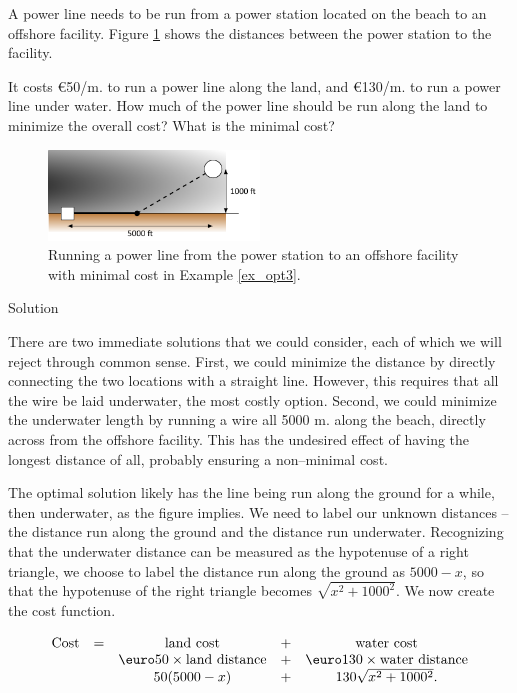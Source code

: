 \begin{example}
\label{ex_opt3}
A power line needs to be run from a power station located on the beach to an offshore facility. Figure \ref{fig_behaviour_30} shows the distances between the power station to the facility.

It costs \euro50/m. to run a power line along the land, and \euro130/m. to run a power line under water. How much of the power line should be run along the land to minimize the overall cost? What is the minimal cost?

\begin{figure}[H]
	\begin{center}
			\includegraphics[width=0.5\textwidth]{fig_behaviour_30}
	\caption{Running a power line from the power station to an offshore facility with minimal cost in Example \ref{ex_opt3}.}
	\label{fig_behaviour_30}
	\end{center}
\end{figure}

Solution 


There are two immediate solutions that we could consider, each of which we will reject through common sense. First, we could minimize the distance by directly connecting the two locations with a straight line. However, this requires that all the wire be laid underwater, the most costly option. Second, we could minimize the underwater length by running a wire all 5000 m. along the beach, directly across from the offshore facility. This has the undesired effect of having the longest distance of all, probably ensuring a non--minimal cost.

The optimal solution likely has the line being run along the ground for a while, then underwater, as the figure implies. We need to label our unknown distances -- the distance run along the ground and the distance run underwater. Recognizing that the underwater distance can be measured as the hypotenuse of a right triangle, we choose to label the distance run along the ground as $5000-x$, so that the hypotenuse of the right triangle becomes $\sqrt{x^2+1000^2}$. We now create the cost function. 

$$
\begin{array}{ccccc}
\text{Cost} &=&  \text{land cost} &+ & \text{water cost} \\
						&	& \text{\euro50}\times \text{land distance} &+& \text{\euro130}\times \text{water distance} \\
						&	& 50(5000-x) &+& 130\sqrt{x^2+1000^2}.\\
\end{array}
$$


\end{example}
